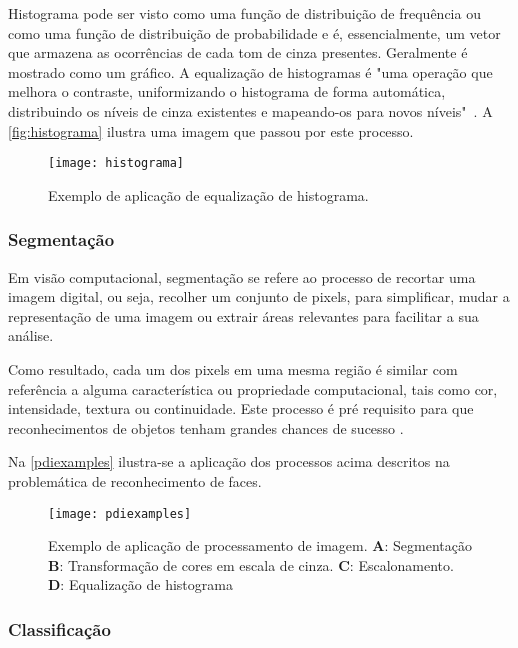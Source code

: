 Histograma pode ser visto como uma função de distribuição de frequência ou como uma função de distribuição de probabilidade e é, essencialmente, um vetor que armazena as ocorrências de cada tom de cinza presentes. Geralmente é mostrado como um gráfico. A equalização de histogramas é "uma operação que melhora o contraste, uniformizando o histograma de forma automática, distribuindo os níveis de cinza existentes e mapeando-os para novos níveis"\ \cite{gabriel_histograma}. A \autoref{fig:histograma} ilustra uma imagem que passou por este processo.

\begin{figure}[h]
	\centering
	\texttt{[image: histograma]}
	\caption{Exemplo de aplicação de equalização de  histograma.}
	\label{fig:histograma}
\end{figure}



\subsubsection{Segmentação}\label{subsubsec:segmentacao}

Em visão computacional, segmentação se refere ao processo de recortar uma imagem digital, ou seja, recolher um conjunto de pixels, para simplificar, mudar a representação de uma imagem ou extrair áreas relevantes para facilitar a sua análise. 

Como resultado, cada um dos pixels em uma mesma região é similar com referência a alguma característica ou propriedade computacional, tais como cor, intensidade, textura ou continuidade. Este processo é pré requisito para que reconhecimentos de objetos tenham grandes chances de sucesso \cite{gonzalez_woods}.


Na \autoref{pdiexamples} ilustra-se a aplicação dos processos acima descritos na problemática de reconhecimento de faces. 

\begin{figure}[h]
	\centering
	\texttt{[image: pdiexamples]}
	\caption{Exemplo de aplicação de processamento de imagem. \textbf{A}: Segmentação \textbf{B}: Transformação de cores em escala de cinza. \textbf{C}: Escalonamento. \textbf{D}: Equalização de histograma  }
	\label{pdiexamples}
\end{figure}


\subsubsection{Classificação}\label{subsubsec:classificacao}

